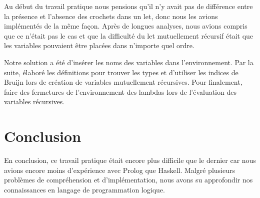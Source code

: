 \documentclass[12pt, letterpaper]{article}
\begin{document}
Au début du travail pratique nous pensions qu'il n'y avait pas de
différence entre la présence et l'absence des crochets dans un let, donc nous 
les avions implémentés de la même façon. Après de longues analyses, nous avions 
compris que ce n'était pas le cas et que la difficulté du let mutuellement 
récursif était que les variables pouvaient être placées dans n'importe quel 
ordre. 

Notre solution a été d'insérer les noms des variables dans l'environnement. 
Par la suite, élaboré les définitions pour trouver les types et d'utiliser les 
indices de Bruijn lors de création de variables mutuellement récursives. Pour 
finalement, faire des fermetures de l'environnement des lambdas lors de
l'évaluation des variables récursives. 

\section*{Conclusion}

En conclusion, ce travail pratique était encore plus difficile que le dernier 
car nous avions encore moins d'expérience avec Prolog que Haskell.
Malgré plusieurs problèmes de compréhension et d'implémentation,
nous avons su approfondir nos connaissances en langage de programmation logique.
\end{document}
